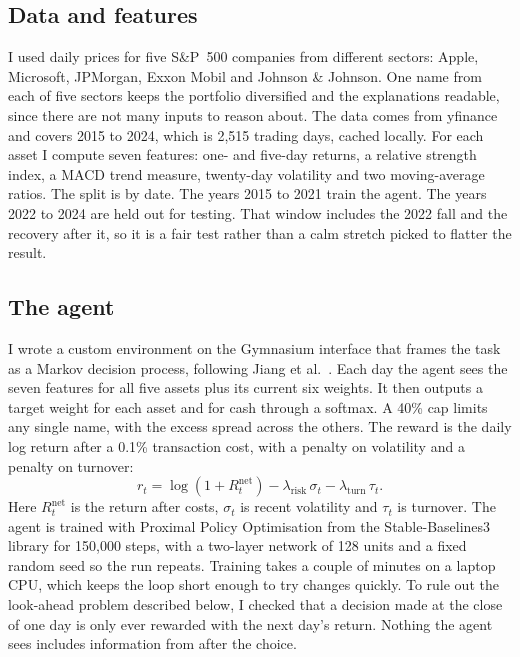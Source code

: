 \documentclass[12pt,twoside,letterpaper]{article}
\begin{document}
\subsection{Data and features}

I used daily prices for five S\&P~500 companies from different sectors: Apple,
Microsoft, JPMorgan, Exxon Mobil and Johnson \& Johnson. One name from each of five
sectors keeps the portfolio diversified and the explanations readable, since there
are not many inputs to reason about. The data comes from yfinance \cite{yfinance}
and covers 2015 to 2024, which is 2{,}515 trading days, cached locally. For each
asset I compute seven features: one- and five-day returns, a relative strength
index, a MACD trend measure, twenty-day volatility and two moving-average ratios.
The split is by date. The years 2015 to 2021 train the agent. The years 2022 to 2024
are held out for testing. That window includes the 2022 fall and the recovery after
it, so it is a fair test rather than a calm stretch picked to flatter the result.

\subsection{The agent}

I wrote a custom environment on the Gymnasium interface that frames the task as a
Markov decision process, following Jiang et al.\ \cite{jiang2017}. Each day the agent
sees the seven features for all five assets plus its current six weights. It then
outputs a target weight for each asset and for cash through a softmax. A 40\% cap
limits any single name, with the excess spread across the others. The reward is the
daily log return after a 0.1\% transaction cost, with a penalty on volatility and a
penalty on turnover:
\begin{equation}
r_t = \log\!\left(1 + R^{\text{net}}_t\right) - \lambda_{\text{risk}}\,\sigma_t
      - \lambda_{\text{turn}}\,\tau_t .
\label{eq:reward}
\end{equation}
Here $R^{\text{net}}_t$ is the return after costs, $\sigma_t$ is recent volatility
and $\tau_t$ is turnover. The agent is trained with Proximal Policy Optimisation
\cite{schulman2017} from the Stable-Baselines3 library \cite{sb3} for 150{,}000
steps, with a two-layer network of 128 units and a fixed random seed so the run
repeats. Training takes a couple of minutes on a laptop CPU, which keeps the loop
short enough to try changes quickly. To rule out the look-ahead problem described
below, I checked that a decision made at the close of one day is only ever rewarded
with the next day's return. Nothing the agent sees includes information from after
the choice.
\end{document}

